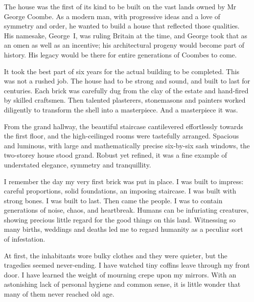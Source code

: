 
% 

\prelude

The house was the first of its kind to be built on the vast lands
owned by Mr George Coombe. As a modern man, with progressive ideas and
a love of symmetry and order, he wanted to build a house that
reflected those qualities. His namesake, George~I, was ruling Britain at the
time, and George took that as an omen as well as an incentive; his
architectural progeny would become part of history. His legacy would
be there for entire generations of Coombes to come.

It took the best part of six years for the actual building to be
completed. This was not a rushed job. The house had to be strong and
sound, and built to last for centuries. Each brick was carefully dug
from the clay of the estate and hand-fired by skilled craftsmen. Then
talented plasterers, stonemasons and painters worked diligently to
transform the shell into a masterpiece. And a masterpiece it was.

From the grand hallway, the beautiful staircase cantilevered
effortlessly towards the first floor, and the high-ceilinged rooms
were tastefully arranged. Spacious and luminous, with large and
mathematically precise six-by-six sash windows, the two-storey house
stood grand. Robust yet refined, it was a fine example of understated
elegance, symmetry and tranquillity.
 
\fugue

I remember the day my very first brick was put in place. I was built
to impress: careful proportions, solid foundations, an imposing
staircase. I was built with strong bones. I was built to last. Then
came the people. I was to contain generations of noise, chaos, and
heartbreak. Humans can be infuriating creatures, showing precious
little regard for the good things on this land. Witnessing so many
births, weddings and deaths led me to regard humanity as a peculiar
sort of infestation.

At first, the inhabitants wore bulky clothes and they were quieter,
but the tragedies seemed never-ending. I have watched tiny coffins
leave through my front door. I have learned the weight of mourning
crepe upon my mirrors. With an astonishing lack of personal hygiene
and common sense, it is little wonder that many of them never reached
old age.

